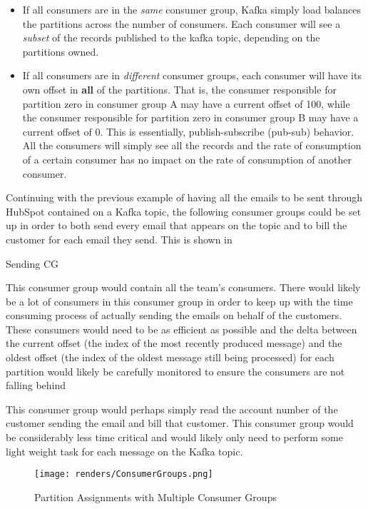 \begin{itemize}
\item{If all consumers are in the \textit{same} consumer group, Kafka simply load balances the partitions across the number of consumers}. Each consumer will see a \textit{subset} of the records published to the kafka topic, depending on the partitions owned.
\item{If all consumers are in \textit{different} consumer groups, each consumer will have its own offset in \textbf{all} of the partitions. That is, the consumer responsible for partition zero in consumer group A may have a current offset of 100, while the consumer responsible for partition zero in consumer group B may have a current offset of 0. This is essentially, publish-subscribe (pub-sub) behavior. All the consumers will simply see all the records and the rate of consumption of a certain consumer has no impact on the rate of consumption of another consumer.}
\end{itemize}

Continuing with the previous example of having all the emails to be sent through HubSpot contained on a Kafka topic, the following consumer groups could be set up in order to both send every email that appears on the topic and to bill the customer for each email they send. This is shown in 
\begin{labeling}{Sending CG}
\item[Sending CG]{This consumer group would contain all the \team{} team's consumers. There would likely be a lot of consumers in this consumer group in order to keep up with the time consuming process of actually sending the emails on behalf of the customers. These consumers would need to be as efficient as possible and the delta between the current offset (the index of the most recently produced message) and the oldest offset (the index of the oldest message still being processed) for each partition would likely be carefully monitored to ensure the consumers are not falling behind}
\item[Billing CG]{This consumer group would perhaps simply read the account number of the customer sending the email and bill that customer. This consumer group would be considerably less time critical and would likely only need to perform some light weight task for each message on the Kafka topic.}
\end{labeling}


\begin{figure}[H]
      \centering
      \texttt{[image: renders/ConsumerGroups.png]}
      \caption{Partition Assignments with Multiple Consumer Groups}
      \label{fig:consumerGroups}
\end{figure}  

